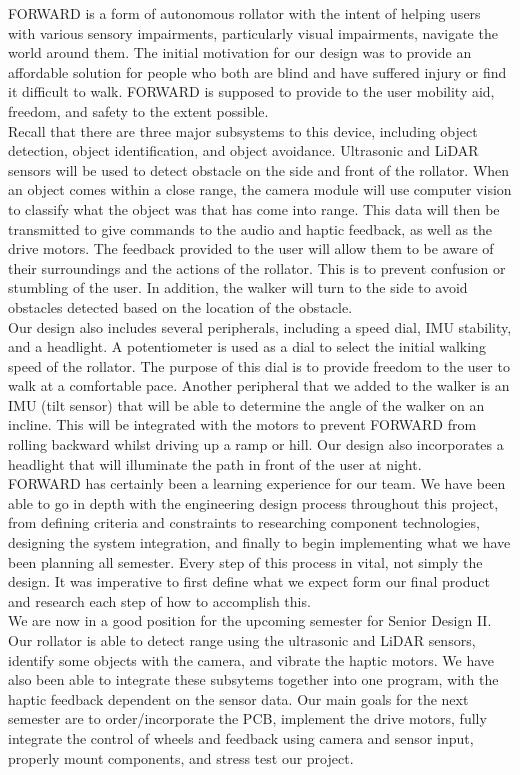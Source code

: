 \noindent FORWARD is a form of autonomous rollator with the intent of helping users with various sensory impairments, particularly visual impairments, navigate the world around them. The initial motivation for our design was to provide an affordable solution for people who both are blind and have suffered injury or find it difficult to walk. FORWARD is supposed to provide to the user mobility aid, freedom, and safety to the extent possible.\\

\noindent Recall that there are three major subsystems to this device, including object detection, object identification, and object avoidance. Ultrasonic and LiDAR sensors will be used to detect obstacle on the side and front of the rollator. When an object comes within a close range, the camera module will use computer vision to classify what the object was that has come into range. This data will then be transmitted to give commands to the audio and haptic feedback, as well as the drive motors. The feedback provided to the user will allow them to be aware of their surroundings and the actions of the rollator. This is to prevent confusion or stumbling of the user. In addition, the walker will turn to the side to avoid obstacles detected based on the location of the obstacle.\\

\noindent Our design also includes several peripherals, including a speed dial, IMU stability, and a headlight. A potentiometer is used as a dial to select the initial walking speed of the rollator. The purpose of this dial is to provide freedom to the user to walk at a comfortable pace. Another peripheral that we added to the walker is an IMU (tilt sensor) that will be able to determine the angle of the walker on an incline. This will be integrated with the motors to prevent FORWARD from rolling backward whilst driving up a ramp or hill. Our design also incorporates a headlight that will illuminate the path in front of the user at night.\\

\noindent FORWARD has certainly been a learning experience for our team. We have been able to go in depth with the engineering design process throughout this project, from defining criteria and constraints to researching component technologies, designing the system integration, and finally to begin implementing what we have been planning all semester. Every step of this process in vital, not simply the design. It was imperative to first define what we expect form our final product and research each step of how to accomplish this.\\

\noindent We are now in a good position for the upcoming semester for Senior Design II. Our rollator is able to detect range using the ultrasonic and LiDAR sensors, identify some objects with the camera, and vibrate the haptic motors. We have also been able to integrate these subsytems together into one program, with the haptic feedback dependent on the sensor data. Our main goals for the next semester are to order/incorporate the PCB, implement the drive motors, fully integrate the control of wheels and feedback using camera and sensor input, properly mount components, and stress test our project.\\